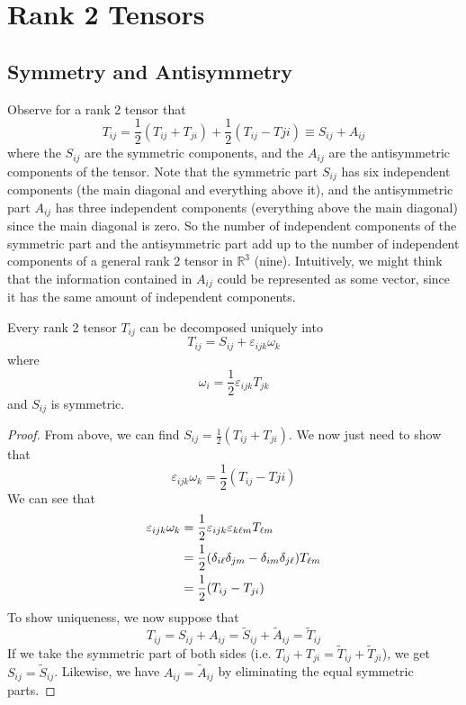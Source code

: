 \documentclass{article}
\begin{document}
\section{Rank 2 Tensors}
\subsection{Symmetry and Antisymmetry}
Observe for a rank 2 tensor that
\[ T_{ij} = \frac{1}{2}\left( T_{ij} + T_{ji} \right) + \frac{1}{2}\left( T_{ij} - T{ji} \right) \equiv S_{ij} + A_{ij} \]
where the $S_{ij}$ are the symmetric components, and the $A_{ij}$ are the antisymmetric components of the tensor. Note that the symmetric part $S_{ij}$ has six independent components (the main diagonal and everything above it), and the antisymmetric part $A_{ij}$ has three independent components (everything above the main diagonal) since the main diagonal is zero. So the number of independent components of the symmetric part and the antisymmetric part add up to the number of independent components of a general rank 2 tensor in $\mathbb R^3$ (nine). Intuitively, we might think that the information contained in $A_{ij}$ could be represented as some vector, since it has the same amount of independent components.
\begin{proposition}
	Every rank 2 tensor $T_{ij}$ can be decomposed uniquely into
	\[ T_{ij} = S_{ij} + \varepsilon_{ijk} \omega_k \]
	where
	\[ \omega_i = \frac{1}{2}\varepsilon_{ijk} T_{jk} \]
	and $S_{ij}$ is symmetric.
\end{proposition}
\begin{proof}
	From above, we can find $S_{ij} = \frac{1}{2}\left( T_{ij} + T_{ji} \right)$. We now just need to show that
	\[ \varepsilon_{ijk} \omega_k = \frac{1}{2}\left( T_{ij} - T{ji} \right) \]
	We can see that
	\begin{align*}
		\varepsilon_{ijk} \omega_k & = \frac{1}{2}\varepsilon_{ijk} \varepsilon_{k\ell m} T_{\ell m}                      \\
		                           & = \frac{1}{2}\qty(\delta_{i\ell} \delta_{jm} - \delta_{im}\delta_{j\ell}) T_{\ell m} \\
		                           & = \frac{1}{2}\qty(T_{ij} - T_{ji})
	\end{align*}
	To show uniqueness, we now suppose that
	\[ T_{ij} = S_{ij} + A_{ij} = \widetilde{S}_{ij} + \widetilde{A}_{ij} = \widetilde{T}_{ij} \]
	If we take the symmetric part of both sides (i.e. $T_{ij} + T_{ji} = \widetilde{T}_{ij} + \widetilde{T}_{ji}$), we get $S_{ij} = \widetilde{S}_{ij}$. Likewise, we have $A_{ij} = \widetilde{A}_{ij}$ by eliminating the equal symmetric parts.
\end{proof}
\end{document}
